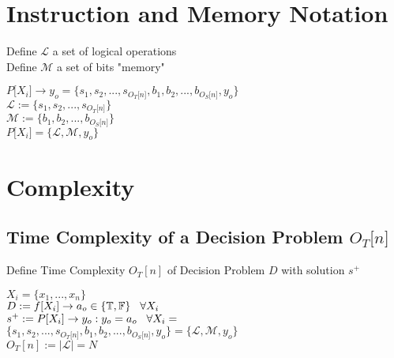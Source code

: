 \documentclass[11pt]{article}
\begin{document}
\section{Instruction and Memory Notation}
Define $\mathcal{L}$ a set of logical operations\\
Define $\mathcal{M}$ a set of bits "memory"
\begin{center}
$
P \lbrack X_i \rbrack \rightarrow y_o = \{ s_1,s_2,...,s_{O_T \lbrack n \rbrack }, b_1, b_2,...,b_{O_S \lbrack n \rbrack},y_o \}
$
\\ \vspace{2mm}
$
\mathcal{L} := \{ s_1,s_2,...,s_{O_T \lbrack n \rbrack}\}
$
\\ \vspace{2mm}
$
\mathcal{M} := \{ b_1,b_2,...,b_{O_S \lbrack n \rbrack}\}
$
\\ \vspace{2mm}
$
P \lbrack X_i \rbrack = \{ \mathcal{L},\mathcal{M},y_o\}
$
\end{center}





















\section{Complexity}

\subsection{Time Complexity of a Decision Problem $O_T \lbrack n \rbrack$}
Define Time Complexity $O_T [n]$ of Decision Problem $D$ with solution $s^+$
\begin{center}
$
X_i = \{x_1,...,x_n\}
$
\\ \vspace{2mm}
$
D := f \lbrack X_i \rbrack \rightarrow a_{o} \in \{\mathbb{T}, \mathbb{F}\} \hspace{3mm} \forall X_i
$
\\ \vspace{2mm}
$
s^+ := P \lbrack X_i \rbrack \rightarrow y_{o} : y_o = a_{o} \hspace{3mm} \forall X_i = 
$
\\ \vspace{2mm}
$
\{ s_1,s_2,...,s_{O_T \lbrack n \rbrack }, b_1, b_2,...,b_{O_S \lbrack n \rbrack},y_o \} = \{ \mathcal{L},\mathcal{M},y_o\}
$
\\ \vspace{3mm}
$
O_T[n] := |\mathcal{L}| = N
$
\end{center}
\end{document}
